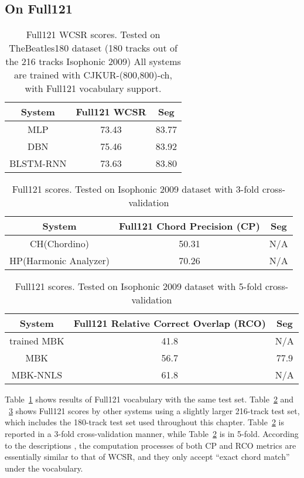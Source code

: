 \subsection{On Full121}

\begin{table}[h]
\footnotesize
\centering
\caption{Full121 WCSR scores. Tested on TheBeatles180 dataset (180 tracks out of the 216 tracks Isophonic 2009) All systems are trained with CJKUR-(800,800)-ch, with Full121 vocabulary support.}
\label{tab:3-full}
\begin{tabular}{|c|c|c|}\hline
System & Full121 WCSR & Seg \\ \hline
MLP & 73.43 & 83.77 \\ \hline
DBN & 75.46 & 83.92 \\ \hline
BLSTM-RNN & 73.63 & 83.80 \\ \hline
\end{tabular}
\end{table}

\begin{table}[h]
\footnotesize
\centering
\caption{Full121 scores. Tested on Isophonic 2009 dataset with 3-fold cross-validation\cite{ni2012end}}
\label{tab:3-fullhp}
\begin{tabular}{|c|c|c|}\hline
System & Full121 Chord Precision (CP) & Seg \\ \hline
CH(Chordino) & 50.31 & N/A \\ \hline
HP(Harmonic Analyzer) & 70.26 & N/A\\ \hline
\end{tabular}
\end{table}

\begin{table}[h]
\footnotesize
\centering
\caption{Full121 scores. Tested on Isophonic 2009 dataset with 5-fold cross-validation \cite{mauch2010automatic}}
\label{tab:3-fullmbk}
\begin{tabular}{|c|c|c|}\hline
System & Full121 Relative Correct Overlap (RCO) & Seg \\ \hline
trained MBK & 41.8 & N/A \\ \hline
MBK & 56.7 & 77.9 \\ \hline
MBK-NNLS & 61.8 & N/A \\ \hline
\end{tabular}
\end{table}

Table~\ref{tab:3-full} shows results of Full121 vocabulary with the same test set. Table~\ref{tab:3-fullhp} and ~\ref{tab:3-fullmbk} shows Full121 scores by other systems using a slightly larger 216-track test set, which includes the 180-track test set used throughout this chapter. Table~\ref{tab:3-fullhp} is reported in a 3-fold cross-validation manner, while Table~\ref{tab:3-fullhp} is in 5-fold. According to the descriptions \cite{ni2012end,mauch2010automatic}, the computation processes of both CP and RCO metrics are essentially similar to that of WCSR, and they only accept ``exact chord match'' under the vocabulary.

